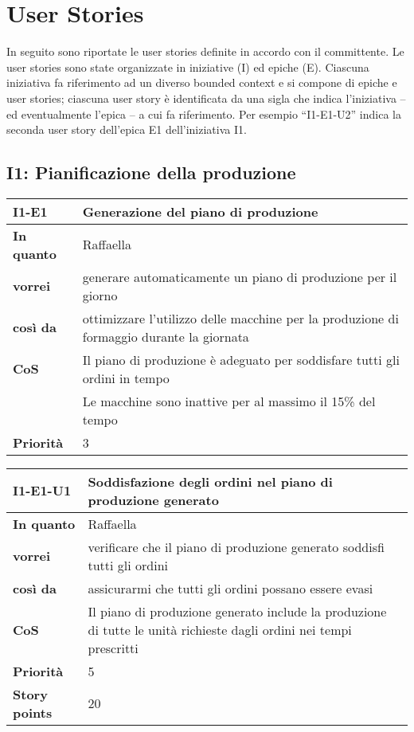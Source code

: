 \chapter{User Stories}
\label{app:user-stories}
In seguito sono riportate le user stories definite in accordo con il committente. Le user stories sono state organizzate in iniziative (I) ed epiche (E).
Ciascuna iniziativa fa riferimento ad un diverso bounded context e si compone di epiche e user stories; ciascuna user story è identificata da una sigla che indica l'iniziativa -- ed eventualmente l'epica -- a cui fa riferimento. Per esempio ``I1-E1-U2'' indica la seconda user story dell'epica E1 dell'iniziativa I1.

\section*{I1: Pianificazione della produzione}

\begin{table}[H]
  \begin{tabularx}{\textwidth}{lX}
    \toprule
    \textbf{I1-E1} & \textbf{Generazione del piano di produzione} \\
    \midrule
    \textbf{In quanto} & Raffaella \\
    \textbf{vorrei} & generare automaticamente un piano di produzione per il giorno \\
    \textbf{così da} & ottimizzare l'utilizzo delle macchine per la produzione di formaggio durante la giornata \\
    \midrule
    \textbf{CoS} & Il piano di produzione è adeguato per soddisfare tutti gli ordini in tempo \\
    & Le macchine sono inattive per al massimo il 15\% del tempo \\
    \midrule
    \textbf{Priorità} & 3 \\
    \bottomrule
  \end{tabularx}
  \label{user-story:i1-e1}
\end{table}

\begin{table}[H]
  \begin{tabularx}{\textwidth}{lX}
    \toprule
    \textbf{I1-E1-U1} & \textbf{Soddisfazione degli ordini nel piano di produzione generato} \\
    \midrule
    \textbf{In quanto} & Raffaella \\
    \textbf{vorrei} & verificare che il piano di produzione generato soddisfi tutti gli ordini \\
    \textbf{così da} & assicurarmi che tutti gli ordini possano essere evasi \\
    \midrule
    \textbf{CoS} & Il piano di produzione generato include la produzione di tutte le unità richieste dagli ordini nei tempi prescritti \\
    \midrule
    \textbf{Priorità} & 5 \\
    \textbf{Story points} & 20 \\
    \bottomrule
  \end{tabularx}
  \label{user-story:i1-e1-u1}
\end{table}

